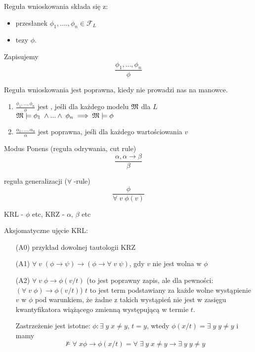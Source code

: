 \begin{definition}{}{}
  Reguła wnioskowania składa się z:
  \begin{itemize}
    \item przesłanek $\phi_1,....,\phi_n\in\mathcal{F}_L$
    \item tezy $\phi$.
  \end{itemize}
  Zapisujemy 
  $$\frac{\phi_1,...,\phi_n}{\phi}$$

  Reguła wnioskowania jest poprawna, kiedy nie prowadzi nas na manowce. 
  \begin{enumerate}
    \item $\frac{\phi_1,...,\phi_n}{\phi}$ jest , jeśli dla każdego modelu $\mathfrak{M}$ dla $L$ $\mathfrak{M}\models\phi_1\;\land...\land\;\phi_n\implies \mathfrak{M}\models\phi$
    \item $\frac{\alpha_1,...,\alpha_n}{\alpha}$ jest poprawna, jeśli dla każdego wartościowania $v$ 
  \end{enumerate}
\end{definition}

\begin{example}[m]
  \item Modus Ponens (reguła odrywania, cut rule) 
    $$\frac{\alpha,\alpha\to \beta}{\beta}$$
  \item reguła generalizacji ($\forall\;$-rule)
    $$\frac{\phi}{\forall\;v\;\phi(v)}$$
\end{example}

KRL - $\phi$ etc, KRZ - $\alpha$, $\beta$ etc

Aksjomatyczne ujęcie KRL:
\begin{itemize}
  \item[(A0)] przykład dowolnej tautologii KRZ
  \item[(A1)] $\forall\;v\;(\phi\to\psi)\to(\phi\to\forall\;v\;\psi)$, gdy $v$ nie jest wolna w $\phi$
  \item[(A2)] $\forall\;v\;\phi\to\phi(v/t)$ (to jest poprawny zapis, ale dla pewności: $(\forall\;v\;\phi)\to\phi(v/t)$)
    $t$ to jest term podstawiany za każde wolne wystąpienie $v$ w $\phi$ pod warunkiem, że żadne z takich wystąpień nie jest w zasięgu kwantyfikatora wiążącego zmienną występującą w termie $t$.

    Zastrzeżenie jest istotne: $\phi:\exists\;y\;x\neq y$, $t=y$, wtedy $\phi(x/t)=\exists\;y\;y\neq y$ i mamy
    $$\not\models\forall\;x\phi\to\phi(x/t)=\forall\;\exists\;y\;x\neq y\to \exists\;y\;y\neq y$$
\end{itemize}

